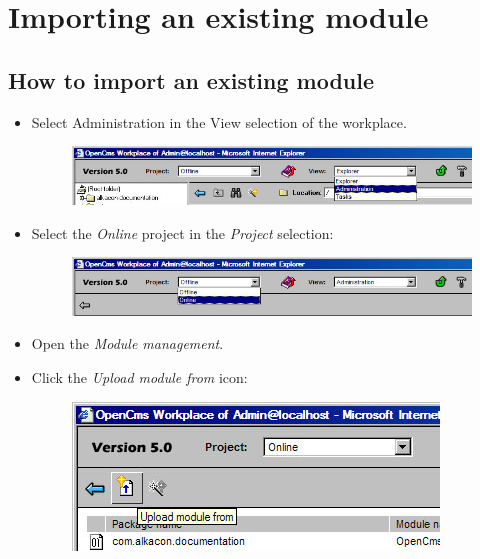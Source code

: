\chapter{Importing an existing module}
\section{How to import an existing module}

\begin{itemize}

\item Select Administration in the View selection of the workplace.
\begin{figure}[hbt]
\begin{center}
\includegraphics[width=\sgw]{pics/modules/import0}
\end{center}
\end{figure}

\item Select the {\em Online} project in the {\em Project} selection:
\begin{figure}[hbt]
\begin{center}
\includegraphics[width=\sgw]{pics/modules/import1}
\end{center}
\end{figure}

\item Open the {\em Module management}.

\item Click the {\em Upload module from} icon:
\begin{figure}[hbt]
\begin{center}
\includegraphics[width=\sgw]{pics/modules/import2}
\end{center}
\end{figure}


\end{itemize}
